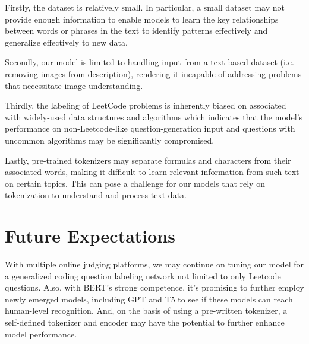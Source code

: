 \documentclass{article}
\begin{document}
Firstly, the dataset is relatively small. In particular, a small dataset may not provide enough information to enable models to learn the key relationships between words or phrases in the text to identify patterns effectively and generalize effectively to new data. 

Secondly, our model is limited to handling input from a text-based dataset (i.e. removing images from description), rendering it incapable of addressing problems that necessitate image understanding.

Thirdly, the labeling of LeetCode problems is inherently biased on associated with widely-used data structures and algorithms which indicates that the model's performance on non-Leetcode-like question-generation input and questions with uncommon algorithms may be significantly compromised.

Lastly, pre-trained tokenizers may separate formulas and characters from their associated words, making it difficult to learn relevant information from such text on certain topics. This can pose a challenge for our models that rely on tokenization to understand and process text data.
\section{Future Expectations}
With multiple online judging platforms, we may continue on tuning our model for a generalized coding question labeling network not limited to only Leetcode questions. 
Also, with BERT's strong competence, it's promising to further employ newly emerged models, including GPT and T5 to see if these models can reach human-level recognition. And, on the basis of using a pre-written tokenizer, a self-defined tokenizer and encoder may have the potential to further enhance model performance. 
\end{document}
